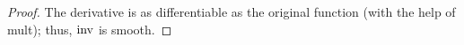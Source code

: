\documentclass[../psets.tex]{subfiles}
\begin{document}
\begin{enumerate}
\begin{enumerate}
\begin{proof}


            The derivative is as differentiable as the original function (with the help of mult); thus, $\operatorname{inv}$ is smooth.
        \end{proof}
    \end{enumerate}
\end{enumerate}
\end{document}
